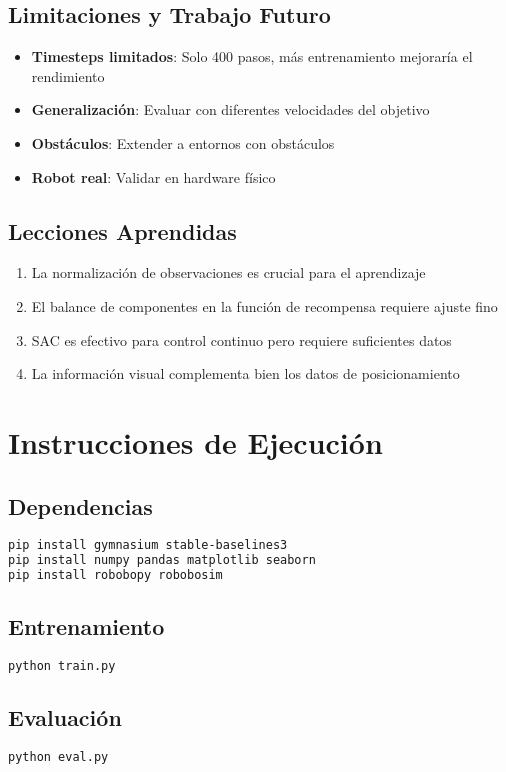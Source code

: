 \documentclass[12pt,a4paper]{article}
\begin{document}
\subsection{Limitaciones y Trabajo Futuro}
\begin{itemize}
    \item \textbf{Timesteps limitados}: Solo 400 pasos, más entrenamiento mejoraría el rendimiento
    \item \textbf{Generalización}: Evaluar con diferentes velocidades del objetivo
    \item \textbf{Obstáculos}: Extender a entornos con obstáculos
    \item \textbf{Robot real}: Validar en hardware físico
\end{itemize}

\subsection{Lecciones Aprendidas}
\begin{enumerate}
    \item La normalización de observaciones es crucial para el aprendizaje
    \item El balance de componentes en la función de recompensa requiere ajuste fino
    \item SAC es efectivo para control continuo pero requiere suficientes datos
    \item La información visual complementa bien los datos de posicionamiento
\end{enumerate}

\section{Instrucciones de Ejecución}

\subsection{Dependencias}
\begin{lstlisting}[language=bash]
pip install gymnasium stable-baselines3 
pip install numpy pandas matplotlib seaborn
pip install robobopy robobosim
\end{lstlisting}

\subsection{Entrenamiento}
\begin{lstlisting}[language=bash]
python train.py
\end{lstlisting}

\subsection{Evaluación}
\begin{lstlisting}[language=bash]
python eval.py
\end{lstlisting}
\end{document}

